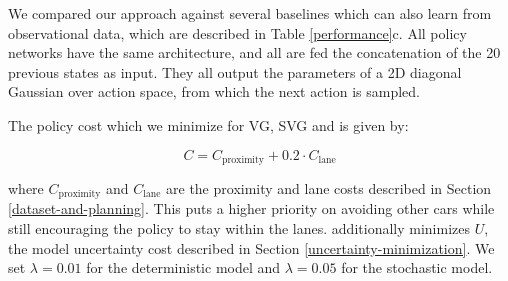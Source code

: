 \documentclass{article} %
\begin{document}
    We compared our approach against several baselines which can also learn from observational data, which are described in Table \ref{performance}c.
    All policy networks have the same architecture, and all are fed the concatenation of the 20 previous states as input. They all output the parameters of a 2D diagonal Gaussian over action space, from which the next action is sampled.






    The policy cost which we minimize for VG, SVG and \modelnamedrop is given by:

    \begin{equation}
      C = C_{\text{proximity}} + 0.2 \cdot C_\text{lane}
    \end{equation}

    where $C_{\text{proximity}}$ and $C_\text{lane}$ are the proximity and lane costs described in Section \ref{dataset-and-planning}. This puts a higher priority on avoiding other cars while still encouraging the policy to stay within the lanes. \modelnamedrop additionally minimizes $U$, the model uncertainty cost described in Section \ref{uncertainty-minimization}. We set $\lambda=0.01$ for the deterministic model and $\lambda=0.05$ for the stochastic model.
\end{document}
